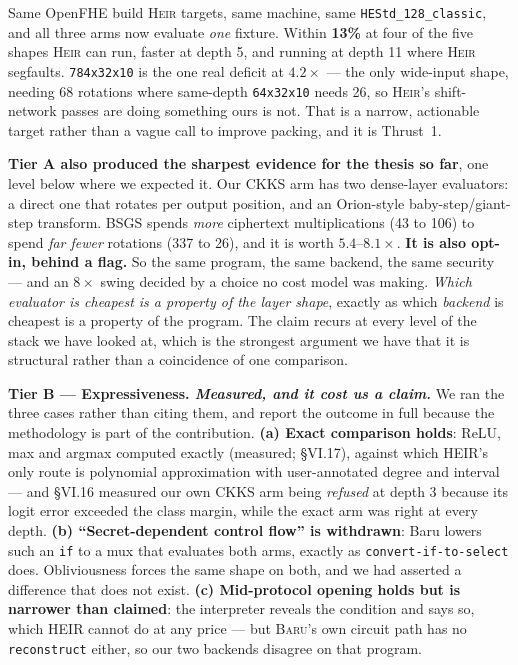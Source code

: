 \documentclass[10pt]{article}
\newcommand{\baru}{\textsc{Baru}}
\newcommand{\heir}{\textsc{Heir}}
\begin{document}
\noindent Same OpenFHE build \heir{} targets, same machine, same
\texttt{HEStd\_128\_classic}, and all three arms now evaluate \emph{one} fixture.
Within \textbf{13\%} at four of the five shapes \heir{} can run, faster at depth
5, and running at depth 11 where \heir{} segfaults. \texttt{784x32x10} is the one
real deficit at $4.2\times$ --- the only wide-input shape, needing 68 rotations
where same-depth \texttt{64x32x10} needs 26, so \heir{}'s shift-network passes
are doing something ours is not. That is a narrow, actionable target rather than
a vague call to improve packing, and it is Thrust~1.

\medskip
\noindent\textbf{Tier A also produced the sharpest evidence for the thesis so
far}, one level below where we expected it. Our CKKS arm has two dense-layer
evaluators: a direct one that rotates per output position, and an Orion-style
baby-step/giant-step transform. BSGS spends \emph{more} ciphertext
multiplications (43 to 106) to spend \emph{far fewer} rotations (337 to 26), and
it is worth $\mathbf{5.4\text{--}8.1\times}$. \textbf{It is also opt-in, behind a
flag.} So the same program, the same backend, the same security --- and an $8\times$
swing decided by a choice no cost model was making. \emph{Which evaluator is
cheapest is a property of the layer shape}, exactly as which \emph{backend} is
cheapest is a property of the program. The claim recurs at every level of the
stack we have looked at, which is the strongest argument we have that it is
structural rather than a coincidence of one comparison.

\medskip
\noindent\textbf{Tier B --- Expressiveness. \emph{Measured, and it cost us a
claim.}} We ran the three cases rather than citing them, and report the outcome
in full because the methodology is part of the contribution.
\textbf{(a) Exact comparison holds}: ReLU, max and argmax computed exactly
(measured; §VI.17), against which HEIR's only route is polynomial approximation
with user-annotated degree and interval --- and §VI.16 measured our own CKKS arm
being \emph{refused} at depth 3 because its logit error exceeded the class
margin, while the exact arm was right at every depth.
\textbf{(b) ``Secret-dependent control flow'' is withdrawn}: Baru lowers such an
\texttt{if} to a mux that evaluates both arms, exactly as
\texttt{convert-if-to-select} does. Obliviousness forces the same shape on both,
and we had asserted a difference that does not exist.
\textbf{(c) Mid-protocol opening holds but is narrower than claimed}: the
interpreter reveals the condition and says so, which HEIR cannot do at any
price --- but \baru{}'s own circuit path has no \texttt{reconstruct} either, so
our two backends disagree on that program.
\end{document}
